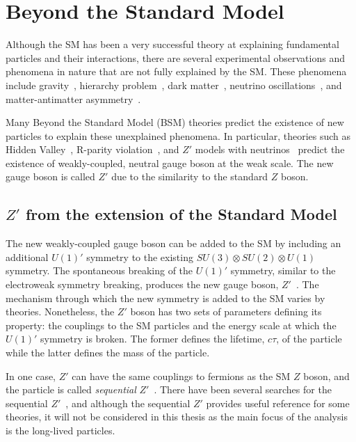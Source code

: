 \section{Beyond the Standard Model}
\label{sec:intro:bsm}

Although the SM has been a very successful theory at explaining fundamental particles and their interactions, there are several experimental observations and phenomena in nature that are not fully explained by the SM. These phenomena include gravity~\cite{PhysRevD.69.105009}, hierarchy problem~\cite{Magg:875284,Magg:133759}, dark matter~\cite{Alpigiani:2281629,bertone2005particle,clowe2006direct}, neutrino oscillations~\cite{ahn2003indications}, and matter-antimatter asymmetry~\cite{toussaint1979matter,dine2003origin}. 

Many Beyond the Standard Model (BSM) theories predict the existence of new particles to explain these unexplained phenomena. In particular, theories such as Hidden Valley~\cite{strassler2007echoes,cassel2010electroweak}, R-parity violation~\cite{senjanovic1975exact,mohapatra1981neutrino}, and $Z'$ models with neutrinos~\cite{Basso:2008iv} predict the existence of weakly-coupled, neutral gauge boson at the weak scale. The new gauge boson is called $Z'$ due to the similarity to the standard $Z$ boson. 

\subsection{\texorpdfstring{$Z'$}{Z'} from the extension of the Standard Model}
\label{sec:intro:zprime_extension}

The new weakly-coupled gauge boson can be added to the SM by including an additional $U(1)'$ symmetry to the existing $SU(3) \otimes SU(2) \otimes U(1)$ symmetry. The spontaneous breaking of the $U(1)'$ symmetry, similar to the electroweak symmetry breaking, produces the new gauge boson, $Z'$~\cite{Langacker:2008yv}. The mechanism through which the new symmetry is added to the SM varies by theories. Nonetheless, the $Z'$ boson has two sets of parameters defining its property: the couplings to the SM particles and the energy scale at which the $U(1)'$ symmetry is broken. The former defines the lifetime, $c\tau$, of the particle while the latter defines the mass of the particle.

In one case, $Z'$ can have the same couplings to fermions as the SM $Z$ boson, and the particle is called \textit{sequential} $Z'$~\cite{BARGER1980377}. There have been several searches for the sequential $Z'$~\cite{PhysRevD.86.095010,ABAZOV201188,PhysRevD.90.052005}, and although the sequential $Z'$ provides useful reference for some theories, it will not be considered in this thesis as the main focus of the analysis is the long-lived particles.

